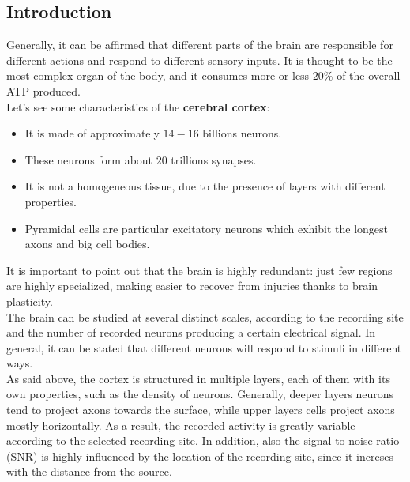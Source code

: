 \subsection{Introduction}
Generally, it can be affirmed that different parts of the brain are responsible
for different actions and respond to different sensory inputs. It is
thought to be the most complex organ of the body, and it consumes more or less
\(20\%\) of the overall ATP produced.\\
Let's see some characteristics of the \textbf{cerebral cortex}:
\begin{itemize}
    \item It is made of approximately \(14-16\) billions neurons.
    \item These neurons form about \(20\) trillions synapses.
    \item It is not a homogeneous tissue, due to the presence of layers with
          different properties.
    \item Pyramidal cells are particular excitatory neurons which exhibit the longest
          axons and big cell bodies.
\end{itemize}
It is important to point out that the brain is highly redundant:
just few regions are highly specialized, making easier to recover from injuries
thanks to brain plasticity.\\
The brain can be studied at several distinct scales, according to the recording site
and the number of recorded neurons producing a certain electrical signal. In general,
it can be stated that different neurons will respond to stimuli in different ways.\\
As said above, the cortex is structured in multiple layers, each of them with its own
properties, such as the density of neurons. Generally, deeper layers neurons
tend to project axons towards the surface, while upper layers cells project axons
mostly horizontally. As a result, the recorded activity is greatly variable according
to the selected recording site. In addition, also the signal-to-noise ratio (SNR) is
highly influenced by the location of the recording site, since it increses with the
distance from the source.

